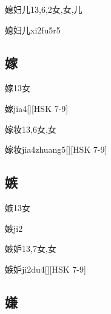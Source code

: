 \begin{Entry}{媳妇儿}{13,6,2}{⼥,⼥,⼉}
  \begin{Phonetics}{媳妇儿}{xi2fu5r5}
  \end{Phonetics}
\end{Entry}

\subsection*{嫁}

\begin{Entry}{嫁}{13}{⼥}
  \begin{Phonetics}{嫁}{jia4}[][HSK 7-9]
  \end{Phonetics}
\end{Entry}

\begin{Entry}{嫁妆}{13,6}{⼥,⼥}
  \begin{Phonetics}{嫁妆}{jia4zhuang5}[][HSK 7-9]
  \end{Phonetics}
\end{Entry}

\subsection*{嫉}

\begin{Entry}{嫉}{13}{⼥}
  \begin{Phonetics}{嫉}{ji2}
  \end{Phonetics}
\end{Entry}

\begin{Entry}{嫉妒}{13,7}{⼥,⼥}
  \begin{Phonetics}{嫉妒}{ji2du4}[][HSK 7-9]
  \end{Phonetics}
\end{Entry}

\subsection*{嫌}

